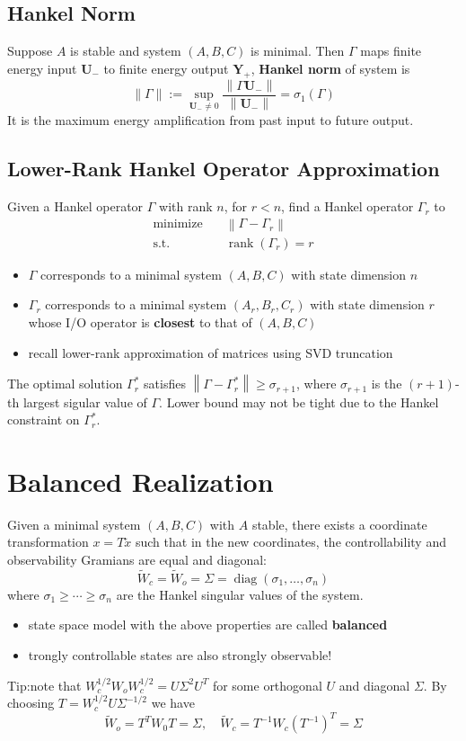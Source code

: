 \documentclass[10pt,a4paper,oneside]{article}
\begin{document}
\subsection{Hankel Norm}
Suppose $A$ is stable and system $(A,B,C)$ is minimal. Then $\Gamma$ maps finite energy input $\mathbf{U_-}$ to finite energy output $\mathbf{Y_+}$, \textbf{Hankel norm} of system is
\[
\|\Gamma\| :=\sup _{\mathbf{U_-} \neq 0 } \frac{\left\|\Gamma \mathbf{U_-}\right\|}{\left\|\mathbf{U}_{-}\right\|}=\sigma_{1}(\Gamma)
\]
It is the maximum energy amplification from past input to future output.

\subsection{Lower-Rank Hankel Operator Approximation}
Given a Hankel operator $\Gamma$ with rank $n$, for $r<n$, find a Hankel operator $\Gamma_r$ to
\begin{align*}
\text {minimize}\quad  & \left\|\Gamma-\Gamma_{r}\right\| \\ 
\text {s.t.}\quad  & \operatorname{rank}\left(\Gamma_{r}\right)=r
\end{align*}

\begin{itemize}
\item $\Gamma$ corresponds to a minimal system $(A,B,C)$ with state dimension $n$
\item $\Gamma_r$ corresponds to a minimal system $(A_r,B_r,C_r)$ with state dimension $r$
whose I/O operator is {\bfseries closest} to that of $(A,B,C)$
\item recall lower-rank approximation of matrices using SVD truncation
\end{itemize}
The optimal solution $\Gamma^*_r$ satisfies $
\left\|\Gamma-\Gamma_{r}^{*}\right\| \geq \sigma_{r+1}
$, where $\sigma_{r+1}$ is the $(r+1)$-th largest sigular value of $\Gamma$. Lower bound may not be tight due to the Hankel constraint on $\Gamma_{r}^*$.

\section{Balanced Realization}
Given a minimal system $(A,B,C)$ with $A$ stable, there exists a coordinate transformation $x=T\widetilde{x}$ such that in the new coordinates, the controllability and observability Gramians are equal and diagonal:
\[
\widetilde{W}_{c}=\widetilde{W}_{o}=\Sigma=\operatorname{diag}\left(\sigma_{1}, \ldots, \sigma_{n}\right)
\]
where $
\sigma_{1} \geq \cdots \geq \sigma_{n}
$ are the Hankel singular values of the system.
\begin{itemize}
\item state space model with the above properties are called {\bfseries balanced}
\item trongly controllable states are also strongly observable!
\end{itemize}
Tip:note that $W_{c}^{1 / 2} W_{o} W_{c}^{1 / 2}=U \Sigma^{2} U^{T}
$ for some orthogonal $U$ and diagonal $\Sigma$. By choosing $
T=W_{c}^{1 / 2} U \Sigma^{-1 / 2}
$ we have
\[
\widetilde{W}_{o}=T^{T} W_{0} T=\Sigma, \quad \widetilde{W}_{c}=T^{-1} W_{c}\left(T^{-1}\right)^{T}=\Sigma
\]
\end{document}
